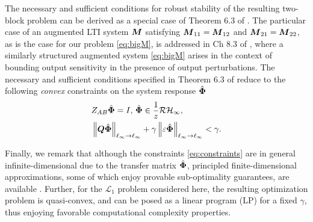 The necessary and sufficient conditions for robust stability of the resulting two-block problem can be derived as a special case of Theorem 6.3 of \cite{khammash1990stability}.  The particular case of an  augmented LTI system $\boldsymbol{M}$ satisfying $\boldsymbol{M}_{11} = \boldsymbol{M}_{12}$ and $\boldsymbol{M}_{21} = \boldsymbol{M}_{22}$, as is the case for our problem \eqref{eq:bigM}, is addressed in Ch 8.3 of \cite{khammash1990stability}, where a similarly structured augmented system \eqref{eq:bigM} arises in the context of bounding output sensitivity in the presence of output perturbations.  The necessary and sufficient conditions specified in Theorem 6.3 of \cite{khammash1990stability} reduce to the following \emph{convex} constraints on the system response $\hat{\boldsymbol{\Phi}}$
\begin{equation} \label{eq:constraints}
\begin{aligned}
&Z_{AB}\hat{\boldsymbol{\Phi}} = I, \, \hat{\boldsymbol{\Phi}} \in \frac{1}{z}\mathcal{RH}_\infty, \\
& \left\|\boldsymbol{Q}\hat{\boldsymbol{\Phi}}\right\|_{\ell_\infty\to\ell_\infty} + \gamma\left\|\varepsilon\hat{\boldsymbol{\Phi}}\right\|_{\ell_\infty\to\ell_\infty} < \gamma.
\end{aligned}
\end{equation}

Finally, we remark that although the constraints \eqref{eq:constraints} are in general infinite-dimensional due to the transfer matrix $\hat{\boldsymbol{\Phi}}$, principled finite-dimensional approximations, some of which enjoy provable sub-optimality guarantees, are available \cite{matni2017scalable,anderson2019system,dean2017sample}.  Further, for the $\mathcal{L}_1$ problem considered here, the resulting optimization problem is quasi-convex, and can be posed as a linear program (LP) for a fixed $\gamma$, thus enjoying favorable computational complexity properties.

